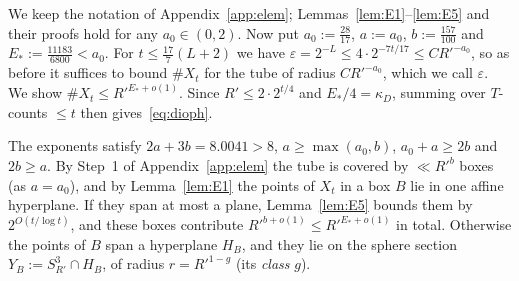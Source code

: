 \documentclass[aps,prx,twocolumn,superscriptaddress,nofootinbib,longbibliography]{revtex4-2}
\theoremstyle{plain}
\theoremstyle{definition}
\theoremstyle{remark}
\begin{document}
We keep the notation of Appendix~\ref{app:elem}; Lemmas~\ref{lem:E1}--\ref{lem:E5} and their proofs hold for any $a_0\in(0,2)$. Now put $a_0:=\tfrac{28}{17}$, $a:=a_0$, $b:=\tfrac{157}{100}$ and $E_*:=\tfrac{11183}{6800}<a_0$. For $t\le\tfrac{17}7(L+2)$ we have $\varepsilon=2^{-L}\le4\cdot2^{-7t/17}\le CR'^{-a_0}$, so as before it suffices to bound $\#X_t$ for the tube of radius $CR'^{-a_0}$, which we call $\varepsilon$. We show $\#X_t\le R'^{E_*+o(1)}$. Since $R'\le2\cdot2^{t/4}$ and $E_*/4=\kappa_D$, summing over $T$-counts $\le t$ then gives~\eqref{eq:dioph}.

The exponents satisfy $2a+3b=8.0041>8$, $a\ge\max(a_0,b)$, $a_0+a\ge2b$ and $2b\ge a$. By Step~1 of Appendix~\ref{app:elem} the tube is covered by $\ll R'^{b}$ boxes (as $a=a_0$), and by Lemma~\ref{lem:E1} the points of $X_t$ in a box $B$ lie in one affine hyperplane. If they span at most a plane, Lemma~\ref{lem:E5} bounds them by $2^{O(t/\log t)}$, and these boxes contribute $R'^{b+o(1)}\le R'^{E_*+o(1)}$ in total. Otherwise the points of $B$ span a hyperplane $H_B$, and they lie on the sphere section $Y_B:=S^3_{R'}\cap H_B$, of radius $r=R'^{1-g}$ (its \emph{class} $g$).
\end{document}
